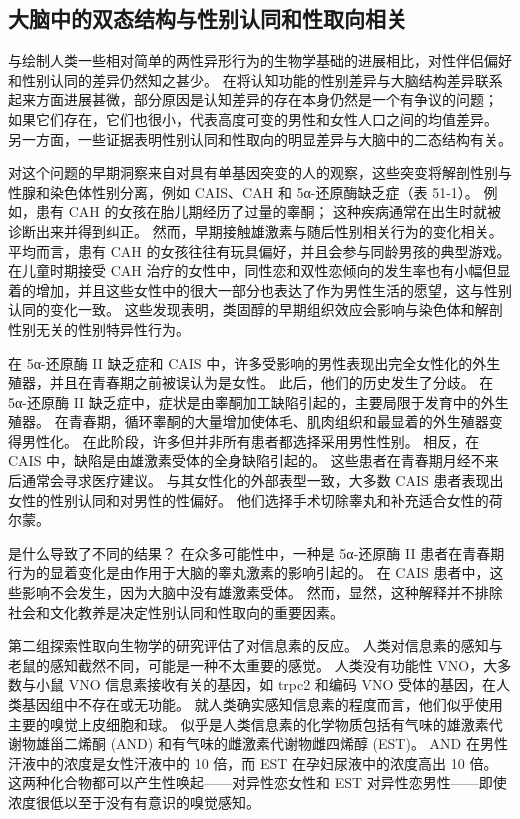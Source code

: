 \subsection{大脑中的双态结构与性别认同和性取向相关}

与绘制人类一些相对简单的两性异形行为的生物学基础的进展相比，对性伴侣偏好和性别认同的差异仍然知之甚少。 在将认知功能的性别差异与大脑结构差异联系起来方面进展甚微，部分原因是认知差异的存在本身仍然是一个有争议的问题； 如果它们存在，它们也很小，代表高度可变的男性和女性人口之间的均值差异。 另一方面，一些证据表明性别认同和性取向的明显差异与大脑中的二态结构有关。

对这个问题的早期洞察来自对具有单基因突变的人的观察，这些突变将解剖性别与性腺和染色体性别分离，例如 CAIS、CAH 和 5α-还原酶缺乏症（表 51-1）。 例如，患有 CAH 的女孩在胎儿期经历了过量的睾酮； 这种疾病通常在出生时就被诊断出来并得到纠正。 然而，早期接触雄激素与随后性别相关行为的变化相关。 平均而言，患有 CAH 的女孩往往有玩具偏好，并且会参与同龄男孩的典型游戏。 在儿童时期接受 CAH 治疗的女性中，同性恋和双性恋倾向的发生率也有小幅但显着的增加，并且这些女性中的很大一部分也表达了作为男性生活的愿望，这与性别认同的变化一致。 这些发现表明，类固醇的早期组织效应会影响与染色体和解剖性别无关的性别特异性行为。

在 5α-还原酶 II 缺乏症和 CAIS 中，许多受影响的男性表现出完全女性化的外生殖器，并且在青春期之前被误认为是女性。 此后，他们的历史发生了分歧。 在 5α-还原酶 II 缺乏症中，症状是由睾酮加工缺陷引起的，主要局限于发育中的外生殖器。 在青春期，循环睾酮的大量增加使体毛、肌肉组织和最显着的外生殖器变得男性化。 在此阶段，许多但并非所有患者都选择采用男性性别。 相反，在 CAIS 中，缺陷是由雄激素受体的全身缺陷引起的。 这些患者在青春期月经不来后通常会寻求医疗建议。 与其女性化的外部表型一致，大多数 CAIS 患者表现出女性的性别认同和对男性的性偏好。 他们选择手术切除睾丸和补充适合女性的荷尔蒙。

是什么导致了不同的结果？ 在众多可能性中，一种是 5α-还原酶 II 患者在青春期行为的显着变化是由作用于大脑的睾丸激素的影响引起的。 在 CAIS 患者中，这些影响不会发生，因为大脑中没有雄激素受体。 然而，显然，这种解释并不排除社会和文化教养是决定性别认同和性取向的重要因素。

第二组探索性取向生物学的研究评估了对信息素的反应。 人类对信息素的感知与老鼠的感知截然不同，可能是一种不太重要的感觉。 人类没有功能性 VNO，大多数与小鼠 VNO 信息素接收有关的基因，如 trpc2 和编码 VNO 受体的基因，在人类基因组中不存在或无功能。 就人类确实感知信息素的程度而言，他们似乎使用主要的嗅觉上皮细胞和球。 似乎是人类信息素的化学物质包括有气味的雄激素代谢物雄甾二烯酮 (AND) 和有气味的雌激素代谢物雌四烯醇 (EST)。 AND 在男性汗液中的浓度是女性汗液中的 10 倍，而 EST 在孕妇尿液中的浓度高出 10 倍。 这两种化合物都可以产生性唤起——对异性恋女性和 EST 对异性恋男性——即使浓度很低以至于没有有意识的嗅觉感知。

